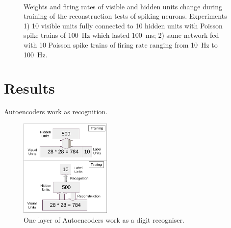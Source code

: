 \documentclass[conference]{IEEEtran}
\begin{document}
\begin{figure}
		\\
		\caption{Weights and firing rates of visible and hidden units change during training of the reconstruction tests of spiking neurons. 
			Experiments 1) 10 visible units fully connected to 10 hidden units with Poisson spike trains of 100~Hz which lasted 100~ms; 2) same network fed with 10 Poisson spike trains of firing rate ranging from 10~Hz to 100~Hz.}
	\end{figure}
\section{Results}
Autoencoders work as recognition.
\begin{figure}
	\centering
	\includegraphics[width=0.4\textwidth]{mnist}
	\caption{One layer of Autoencoders work as a digit recogniser.}
	\label{fig:mnist}		
\end{figure}
\end{document}
